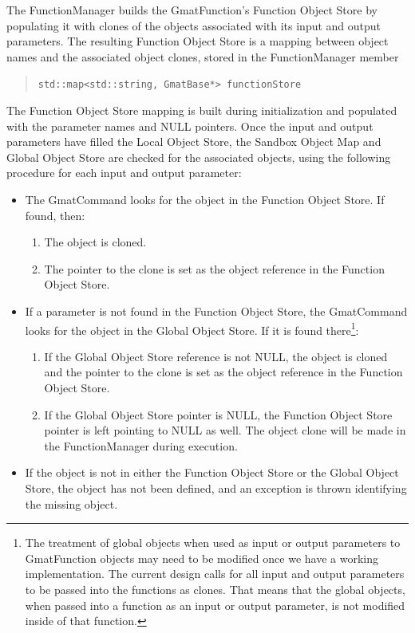 The FunctionManager builds the GmatFunction's Function Object Store by populating it with clones of
the objects associated with its input and output parameters.  The resulting Function Object Store is
a mapping between object names and the associated object clones, stored in the FunctionManager
member

\begin{quote}
\texttt{std::map<std::string, GmatBase*> functionStore}
\end{quote}

\noindent The Function Object Store mapping is built during initialization and populated with the
parameter names and NULL pointers.  Once the input and output parameters have filled the Local
Object Store, the Sandbox Object Map and Global Object Store are checked for the associated
objects, using the following procedure for each input and output parameter:

\begin{itemize}
\item The GmatCommand looks for the object in the Function Object Store.  If found, then:
\begin{enumerate}
\item The object is cloned.
\item The pointer to the clone is set as the object reference in the Function Object Store.
\end{enumerate}
\item If a parameter is not found in the Function Object Store, the GmatCommand looks for
the object in the Global Object Store.  If it is found there\footnote{The treatment of global
objects when used as input or output parameters to GmatFunction objects may need to be modified
once we have a working implementation.  The current design calls for all input and output
parameters to be passed into the functions as clones.  That means that the global objects, when
passed into a function as an input or output parameter, is not modified inside of that function.}:
\begin{enumerate}
\item If the Global Object Store reference is not NULL, the object is cloned and the pointer
to the clone is set as the object reference in the Function Object Store.
\item If the Global Object Store pointer is NULL, the Function Object Store pointer is left pointing
to NULL as well.  The object clone will be made in the FunctionManager during execution.
\end{enumerate}
\item If the object is not in either the Function Object Store or the Global Object Store, the
object has not been defined, and an exception is thrown identifying the missing object.
\end{itemize}

